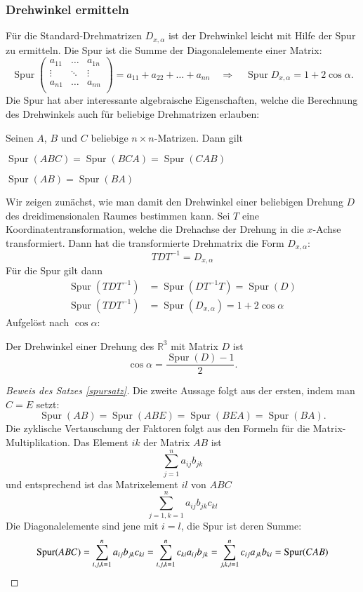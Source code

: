 \subsubsection{Drehwinkel ermitteln}
Für die Standard-Drehmatrizen $D_{x,\alpha}$ ist der Drehwinkel 
leicht mit Hilfe der Spur zu ermitteln.
Die Spur ist die Summe der
Diagonalelemente einer Matrix:
\[
\operatorname{Spur}
\begin{pmatrix}
a_{11}&\dots &a_{1n}\\
\vdots&\ddots&\vdots\\
a_{n1}&\dots &a_{nn}\\
\end{pmatrix}
=a_{11}+a_{22}+\dots+a_{nn}
\quad
\Rightarrow
\quad
\operatorname{Spur}D_{x,\alpha}=1+2\cos\alpha.
\]
Die Spur hat aber interessante algebraische Eigenschaften, welche
die Berechnung des Drehwinkels auch für beliebige Drehmatrizen
erlauben:
\begin{satz}
\label{spursatz}
Seinen $A$, $B$ und $C$ beliebige $n\times n$-Matrizen.
Dann gilt
\begin{compactenum}
\item $\operatorname{Spur}(ABC)=\operatorname{Spur}(BCA)=\operatorname{Spur}(CAB)$
\item $\operatorname{Spur}(AB)=\operatorname{Spur}(BA)$
\end{compactenum}
\end{satz}
Wir zeigen zunächst, wie man damit den Drehwinkel einer beliebigen
Drehung $D$ des dreidimensionalen Raumes bestimmen kann.
Sei $T$ eine Koordinatentransformation, welche die Drehachse der Drehung in die
$x$-Achse transformiert.
Dann hat die transformierte Drehmatrix die Form $D_{x,\alpha}$:
\[
TDT^{-1}= D_{x,\alpha}
\]
Für die Spur gilt dann
\begin{align*}
\operatorname{Spur}(TDT^{-1})
&=
\operatorname{Spur}(DT^{-1}T)
=
\operatorname{Spur}(D)
\\
\operatorname{Spur}(TDT^{-1})
&=
\operatorname{Spur}(D_{x,\alpha})=1+2\cos\alpha
\end{align*}
Aufgelöst nach $\cos\alpha$:
\begin{satz}\label{drehwinkelsatz}
Der Drehwinkel einer Drehung des $\mathbb R^3$ mit Matrix $D$ ist
\[
\cos\alpha =\frac{\operatorname{Spur}(D) -1 }2.
\]
\end{satz}

\begin{proof}[Beweis des Satzes \ref{spursatz}]
Die zweite Aussage folgt aus der ersten, indem man $C=E$ setzt:
\[
\operatorname{Spur}(AB)=\operatorname{Spur}(ABE)=\operatorname{Spur}(BEA)=
\operatorname{Spur}(BA).
\]
Die zyklische Vertauschung der Faktoren folgt aus den Formeln für die
Matrix-Multiplikation.
Das Element $ik$ der Matrix $AB$ ist
\[
\sum_{j=1}^na_{ij}b_{jk}
\]
und entsprechend ist das Matrixelement $il$ von $ABC$ 
\[
\sum_{j=1, k=1}^na_{ij}b_{jk}c_{kl}
\]
Die Diagonalelemente sind jene mit $i=l$, die Spur ist deren Summe:
\[
\operatorname{Spur}(ABC)
=\sum_{i,j,k=1}^na_{ij}b_{jk}c_{ki}
=\sum_{i,j,k=1}^nc_{ki}a_{ij}b_{jk}
=\sum_{j,k,i=1}^nc_{ij}a_{jk}b_{ki}
=\operatorname{Spur}(CAB)
\qedhere
\]
\end{proof}

